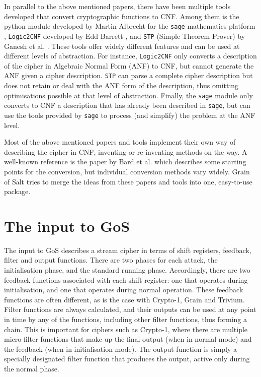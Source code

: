 \documentclass{llncs}
\begin{document}
In parallel to the above mentioned papers, there have been multiple tools developed that convert cryptographic functions to CNF. Among them is the python module developed by Martin Albrecht for the \texttt{sage} mathematics platform \cite{SAGE}, \texttt{Logic2CNF} developed by Edd Barrett \cite{Logic2CNF}, and \texttt{STP} (Simple Theorem Prover) by Ganesh et al. \cite{DBLP:conf/cav/GaneshD07}. These tools offer widely different features and can be used at different levels of abstraction. For instance, \texttt{Logic2CNF} only converts a description of the cipher in Algebraic Normal Form (ANF) to CNF, but cannot generate the ANF given a cipher description. \texttt{STP} can parse a complete cipher description but does not retain or deal with the ANF form of the description, thus omitting optimisations possible at that level of abstraction. Finally, the \texttt{sage} module only converts to CNF a description that has already been described in \texttt{sage}, but can use the tools provided by \texttt{sage} to process (and simplify) the problem at the ANF level.

Most of the above mentioned papers and tools implement their own way of describing the cipher in CNF, inventing or re-inventing methods on the way. A well-known reference is the paper by Bard et al. \cite{Bard07efficientmethods} which describes some starting points for the conversion, but individual conversion methods vary widely. Grain of Salt tries to merge the ideas from these papers and tools into one, easy-to-use package.

\section{The input to GoS}
\label{sect:gos-input}
The input to GoS describes a stream cipher in terms of shift registers, feedback, filter and output functions. There are two phases for each attack, the initialisation phase, and the standard running phase. Accordingly, there are two feedback functions associated with each shift register: one that operates during initialisation, and one that operates during normal operation. These feedback functions are often different, as is the case with Crypto-1, Grain and Trivium. Filter functions are always calculated, and their outputs can be used at any point in time by any of the functions, including other filter functions, thus forming a chain. This is important for ciphers such as Crypto-1, where there are multiple micro-filter functions that make up the final output (when in normal mode) and the feedback (when in initialisation mode). The output function is simply a specially designated filter function that produces the output, active only during the normal phase.
\end{document}
